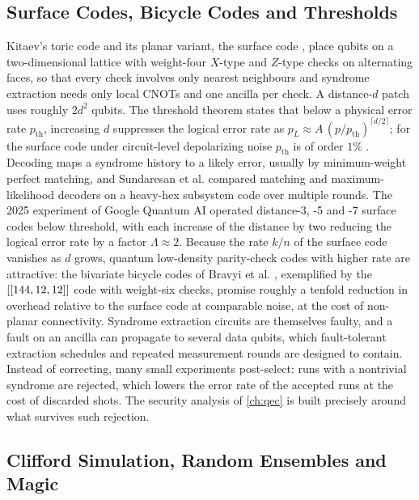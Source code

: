 \subsection{Surface Codes, Bicycle Codes and Thresholds}

Kitaev's toric code \cite{kitaev2003anyons} and its planar variant, the surface code \cite{dennis2002topological,fowler2012surfacecodes}, place qubits on a two-dimensional lattice with weight-four $X$-type and $Z$-type checks on alternating faces, so that every check involves only nearest neighbours and syndrome extraction needs only local CNOTs and one ancilla per check. A distance-$d$ patch uses roughly $2d^2$ qubits. The threshold theorem states that below a physical error rate $p_{\mathrm{th}}$, increasing $d$ suppresses the logical error rate as $p_L\approx A\,(p/p_{\mathrm{th}})^{\lceil d/2\rceil}$; for the surface code under circuit-level depolarizing noise $p_{\mathrm{th}}$ is of order $1\%$ \cite{fowler2012surfacecodes}. Decoding maps a syndrome history to a likely error, usually by minimum-weight perfect matching, and Sundaresan et al. \cite{sundaresan2023subsystem} compared matching and maximum-likelihood decoders on a heavy-hex subsystem code over multiple rounds. The 2025 experiment of Google Quantum AI \cite{acharya2025belowthreshold} operated distance-3, -5 and -7 surface codes below threshold, with each increase of the distance by two reducing the logical error rate by a factor $\Lambda\approx2$. Because the rate $k/n$ of the surface code vanishes as $d$ grows, quantum low-density parity-check codes with higher rate are attractive: the bivariate bicycle codes of Bravyi et al. \cite{bravyi2024bicycle}, exemplified by the $[[144,12,12]]$ code with weight-six checks, promise roughly a tenfold reduction in overhead relative to the surface code at comparable noise, at the cost of non-planar connectivity. Syndrome extraction circuits are themselves faulty, and a fault on an ancilla can propagate to several data qubits, which fault-tolerant extraction schedules and repeated measurement rounds are designed to contain. Instead of correcting, many small experiments post-select: runs with a nontrivial syndrome are rejected, which lowers the error rate of the accepted runs at the cost of discarded shots. The security analysis of \cref{ch:qec} \cite{guo2026qecaudit} is built precisely around what survives such rejection.

\subsection{Clifford Simulation, Random Ensembles and Magic}

